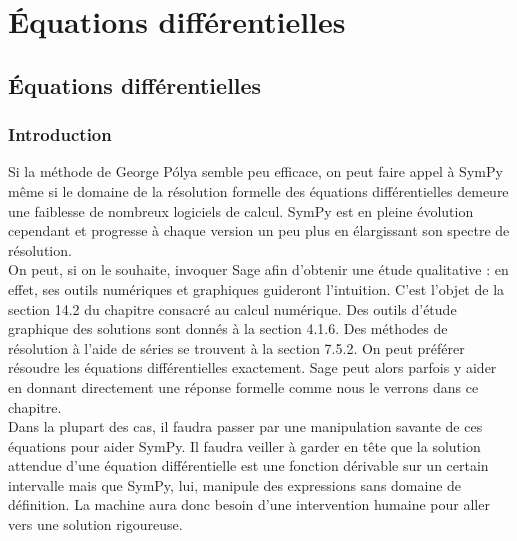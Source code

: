 \chapter{Équations différentielles}
 \section{Équations différentielles}
 \subsection{Introduction}
Si la méthode de George Pólya semble peu efficace, on peut faire appel à SymPy même si le domaine de la résolution formelle des équations différentielles demeure une faiblesse de nombreux logiciels de calcul. SymPy est en pleine évolution cependant et progresse à chaque version un peu plus en élargissant son spectre de
résolution.
\\
On peut, si on le souhaite, invoquer Sage afin d’obtenir une étude qualitative :
en effet, ses outils numériques et graphiques guideront l’intuition. C’est l’objet
de la section 14.2 du chapitre consacré au calcul numérique. Des outils d’étude
graphique des solutions sont donnés à la section 4.1.6. Des méthodes de résolution
à l’aide de séries se trouvent à la section 7.5.2.
On peut préférer résoudre les équations différentielles exactement. Sage peut
alors parfois y aider en donnant directement une réponse formelle comme nous le
verrons dans ce chapitre.
\\
Dans la plupart des cas, il faudra passer par une manipulation savante de
ces équations pour aider SymPy. Il faudra veiller à garder en tête que la solution
attendue d’une équation différentielle est une fonction dérivable sur un certain
intervalle mais que SymPy, lui, manipule des expressions sans domaine de définition.
La machine aura donc besoin d’une intervention humaine pour aller vers une
solution rigoureuse.
\\ 

